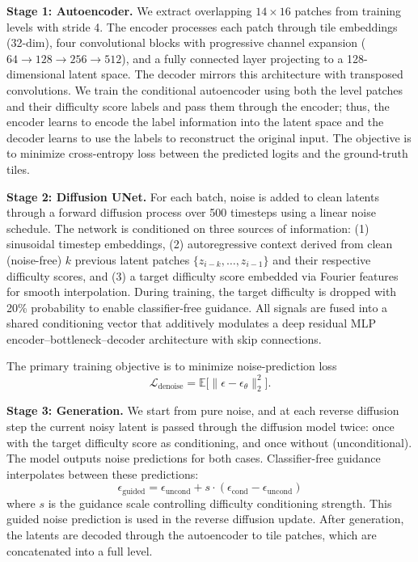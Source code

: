 \documentclass[conference]{IEEEtran}
\begin{document}
\textbf{Stage 1: Autoencoder.} We extract overlapping $14 \times 16$ patches from training levels with stride 4. The encoder processes each patch through tile embeddings (32-dim), four convolutional blocks with progressive channel expansion ($64 \rightarrow 128 \rightarrow 256 \rightarrow 512$), and a fully connected layer projecting to a 128-dimensional latent space. The decoder mirrors this architecture with transposed convolutions. We train the conditional autoencoder using both the level patches and their difficulty score labels and pass them through the encoder; thus, the encoder learns to encode the label information into the latent space and the decoder learns to use the labels to reconstruct the original input. The objective is to minimize cross-entropy loss between the predicted logits and the ground-truth tiles.

\textbf{Stage 2: Diffusion UNet.}
For each batch, noise is added to clean latents through a forward diffusion process over 500 timesteps using a linear noise schedule. The network is conditioned on three sources of information:
(1) sinusoidal timestep embeddings,
(2) autoregressive context derived from clean (noise-free) $k$ previous latent patches $\{z_{i-k}, \ldots, z_{i-1}\}$ and their respective difficulty scores, and
(3) a target difficulty score embedded via Fourier features for smooth interpolation. During training, the target difficulty is dropped with 20\% probability to enable classifier-free guidance.
All signals are fused into a shared conditioning vector that additively modulates a deep residual MLP encoder--bottleneck--decoder architecture with skip connections.

The primary training objective is to minimize noise-prediction loss
\[
\mathcal{L}_{\text{denoise}} 
= \mathbb{E}\big[\|\epsilon - \epsilon_\theta\|_2^2\big].
\]

\textbf{Stage 3: Generation.}
We start from pure noise, and at each reverse diffusion step the current noisy latent is passed through the diffusion model twice: once with the target difficulty score as conditioning, and once without (unconditional). The model outputs noise predictions for both cases. Classifier-free guidance interpolates between these predictions:
\begin{equation}
\epsilon_{\text{guided}} = \epsilon_{\text{uncond}} + s \cdot (\epsilon_{\text{cond}} - \epsilon_{\text{uncond}})
\end{equation}
where $s$ is the guidance scale controlling difficulty conditioning strength. This guided noise prediction is used in the reverse diffusion update. After generation, the latents are decoded through the autoencoder to tile patches, which are concatenated into a full level.
\end{document}
